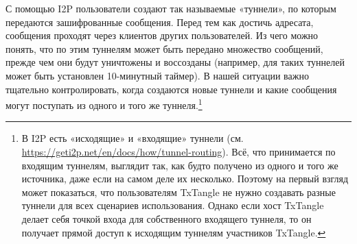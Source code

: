 С помощью I2P пользователи создают так называемые «туннели», по которым передаются зашифрованные сообщения.  Перед тем как достичь адресата, сообщения проходят через клиентов других пользователей. Из чего можно понять, что по этим туннелям может быть передано множество сообщений, прежде чем они будут уничтожены и воссозданы (например, для таких туннелей может быть установлен 10-минутный таймер). В нашей ситуации важно тщательно контролировать, когда создаются новые туннели и какие сообщения могут посту\-пать из одного и того же туннеля.\footnote{В I2P есть «исходящие» и «входящие» туннели (см. \url{https://geti2p.net/en/docs/how/tunnel-routing}). Всё, что принимается по входящим туннелям, выглядит так, как будто получено из одного и того же источника, даже если на самом деле их несколько. Поэтому на первый взгляд может показаться, что пользователям TxTangle не нужно создавать разные туннели для всех сценариев использования. Однако если хост TxTangle делает себя точкой входа для собственного входящего туннеля, то он получает прямой доступ к исходящим туннелям участников TxTangle.}%
